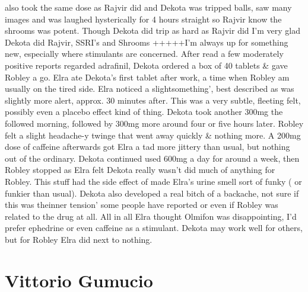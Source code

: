 \documentclass[12pt]{book}
\begin{document}
also took the same dose as Rajvir did and Dekota was tripped balls, saw many images and was laughed hysterically for 4 hours straight so Rajvir know the shrooms was potent. Though Dekota did trip as hard as Rajvir did I'm very glad Dekota did Rajvir, SSRI's and Shrooms +++++I'm always up for something new, especially where stimulants are concerned. After read a few moderately positive reports regarded adrafinil, Dekota ordered a box of 40 tablets \& gave Robley a go. Elra ate Dekota's first tablet after work, a time when Robley am usually on the tired side. Elra noticed a slightsomething', best described as was slightly more alert, approx. 30 minutes after. This was a very subtle, fleeting felt, possibly even a placebo effect kind of thing. Dekota took another 300mg the followed morning, followed by 300mg more around four or five hours later. Robley felt a slight headache-y twinge that went away quickly \& nothing more. A 200mg dose of caffeine afterwards got Elra a tad more jittery than usual, but nothing out of the ordinary. Dekota continued used 600mg a day for around a week, then Robley stopped as Elra felt Dekota really wasn't did much of anything for Robley. This stuff had the side effect of made Elra's urine smell sort of funky ( or funkier than usual). Dekota also developed a real bitch of a backache, not sure if this was theinner tension' some people have reported or even if Robley was related to the drug at all. All in all Elra thought Olmifon was disappointing, I'd prefer ephedrine or even caffeine as a stimulant. Dekota may work well for others, but for Robley Elra did next to nothing.



\chapter{Vittorio Gumucio}
\end{document}
